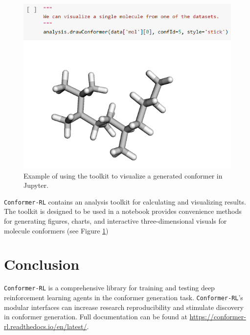 \documentclass[twoside,11pt]{article}
\newcommand{\code}[1]{\texttt{#1}}
\newcommand{\titleofpaper}{Conformer-RL}
\begin{document}
\begin{figure}[h]
  \centering
  \includegraphics[scale=0.8]{molecules.png}
  \caption{
    Example of using the toolkit to visualize a generated conformer in Jupyter.
  }
  \label{fig:molecules}
\end{figure}

\code{\titleofpaper} contains an analysis toolkit for calculating and visualizing results. The toolkit is designed to be used in a notebook provides convenience methods for generating figures, charts, and interactive three-dimensional visuals for molecule conformers (see Figure \ref{fig:molecules})

\section{Conclusion}
\code{\titleofpaper} is a comprehensive library for training and testing deep reinforcement learning agents in the conformer generation task. \code{\titleofpaper}'s modular interfaces can increase research reproducibility and stimulate discovery in conformer generation. Full documentation can be found at \url{https://conformer-rl.readthedocs.io/en/latest/}.



\newpage


\vskip 0.2in




\newpage

\end{document}
